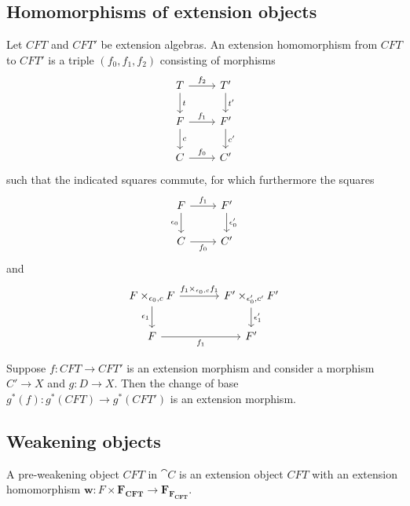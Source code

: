 \subsection{Homomorphisms of extension objects}
\begin{defn}
Let $CFT$ and $CFT'$ be extension algebras. An extension homomorphism from 
$CFT$ to $CFT'$ is a triple $(f_0,f_1,f_2)$ consisting of morphisms
\begin{equation*}
\begin{tikzcd}
T 
  \ar{r}{f_2}
  \ar{d}{t}
  &
T'
  \ar{d}{t'}
  \\
F 
  \ar{r}{f_1}
  \ar{d}{c}
  &
F'
  \ar{d}{c'}
  \\
C 
  \ar{r}{f_0}
  &
C'
\end{tikzcd}
\end{equation*}
such that the indicated squares commute, for which furthermore the squares
\begin{equation*}
\begin{tikzcd}
F \ar{r}{f_1}
  \ar{d}[swap]{\epsilon_0}
  &
F'
  \ar{d}{\epsilon_0'}
  \\
C \ar{r}[swap]{f_0}
  &
C'
\end{tikzcd}
\end{equation*}
and
\begin{equation*}
\begin{tikzcd}[column sep=large]
F\times_{\epsilon_0,c} F
  \ar{r}{f_1\times_{\epsilon_0,c} f_1}
  \ar{d}[swap]{\epsilon_1}
  &
F'\times_{\epsilon_0',c'} F'
  \ar{d}{\epsilon_1'}
  \\
F \ar{r}[swap]{f_1}
  &
F'
\end{tikzcd}
\end{equation*}
\end{defn}

\begin{lem}
Suppose $f:CFT\to CFT'$ is an extension morphism and consider a morphism
$C'\to X$ and $g:D\to X$. Then the change of base $g^\ast(f):g^\ast(CFT)\to
g^\ast(CFT')$ is an extension morphism.
\end{lem}

\subsection{Weakening objects}
\begin{defn}
A pre-weakening object $CFT$ in $\cat{C}$ is an extension object $CFT$ with 
an extension homomorphism $\mathbf{w}:F\times\mathbf{F_{CFT}}\to \mathbf{F_{F_{CFT}}}$.
\end{defn}

